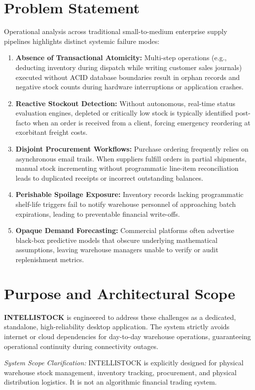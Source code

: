 \documentclass[BTech]{srmuthesis}
\begin{document}
\section{Problem Statement}
Operational analysis across traditional small-to-medium enterprise supply pipelines highlights distinct systemic failure modes:
\begin{enumerate}
    \item \textbf{Absence of Transactional Atomicity:} Multi-step operations (e.g., deducting inventory during dispatch while writing customer sales journals) executed without \ac{ACID} database boundaries result in orphan records and negative stock counts during hardware interruptions or application crashes.
    \item \textbf{Reactive Stockout Detection:} Without autonomous, real-time status evaluation engines, depleted or critically low stock is typically identified post-facto when an order is received from a client, forcing emergency reordering at exorbitant freight costs.
    \item \textbf{Disjoint Procurement Workflows:} Purchase ordering frequently relies on asynchronous email trails. When suppliers fulfill orders in partial shipments, manual stock incrementing without programmatic line-item reconciliation leads to duplicated receipts or incorrect outstanding balances.
    \item \textbf{Perishable Spoilage Exposure:} Inventory records lacking programmatic shelf-life triggers fail to notify warehouse personnel of approaching batch expirations, leading to preventable financial write-offs.
    \item \textbf{Opaque Demand Forecasting:} Commercial platforms often advertise black-box predictive models that obscure underlying mathematical assumptions, leaving warehouse managers unable to verify or audit replenishment metrics.
\end{enumerate}

\section{Purpose and Architectural Scope}
\textbf{INTELLISTOCK} is engineered to address these challenges as a dedicated, standalone, high-reliability desktop application. The system strictly avoids internet or cloud dependencies for day-to-day warehouse operations, guaranteeing operational continuity during connectivity outages. 

\textit{System Scope Clarification:} INTELLISTOCK is explicitly designed for physical warehouse stock management, inventory tracking, procurement, and physical distribution logistics. It is not an algorithmic financial trading system.
\end{document}
